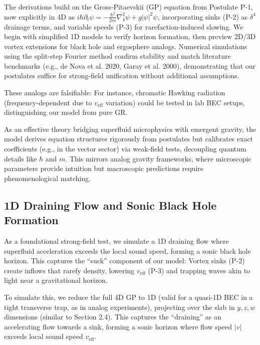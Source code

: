 \documentclass{article}
\begin{document}
The derivations build on the Gross-Pitaevskii (GP) equation from Postulate P-1, now explicitly in 4D as $i \hbar \partial_t \psi = -\frac{\hbar^2}{2 m} \nabla_4^2 \psi + g |\psi|^2 \psi$, incorporating sinks (P-2) as $\delta^4$ drainage terms, and variable speeds (P-3) for rarefaction-induced slowing. We begin with simplified 1D models to verify horizon formation, then preview 2D/3D vortex extensions for black hole and ergosphere analogs. Numerical simulations using the split-step Fourier method confirm stability and match literature benchmarks (e.g., de Nova et al. 2020, Garay et al. 2000), demonstrating that our postulates suffice for strong-field unification without additional assumptions.

These analogs are falsifiable: For instance, chromatic Hawking radiation (frequency-dependent due to $v_{\text{eff}}$ variation) could be tested in lab BEC setups, distinguishing our model from pure GR.

As an effective theory bridging superfluid microphysics with emergent gravity, the model derives equation structures rigorously from postulates but calibrates exact coefficients (e.g., in the vector sector) via weak-field tests, decoupling quantum details like $\hbar$ and $m$. This mirrors analog gravity frameworks, where microscopic parameters provide intuition but macroscopic predictions require phenomenological matching.

\subsection{1D Draining Flow and Sonic Black Hole Formation}

As a foundational strong-field test, we simulate a 1D draining flow where superfluid acceleration exceeds the local sound speed, forming a sonic black hole horizon. This captures the ``suck'' component of our model: Vortex sinks (P-2) create inflows that rarefy density, lowering $v_{\text{eff}}$ (P-3) and trapping waves akin to light near a gravitational horizon.

To simulate this, we reduce the full 4D GP to 1D (valid for a quasi-1D BEC in a tight transverse trap, as in analog experiments), projecting over the slab in $y,z,w$ dimensions (similar to Section 2.4). This captures the ``draining'' as an accelerating flow towards a sink, forming a sonic horizon where flow speed $|v|$ exceeds local sound speed $v_{\text{eff}}$.
\end{document}
